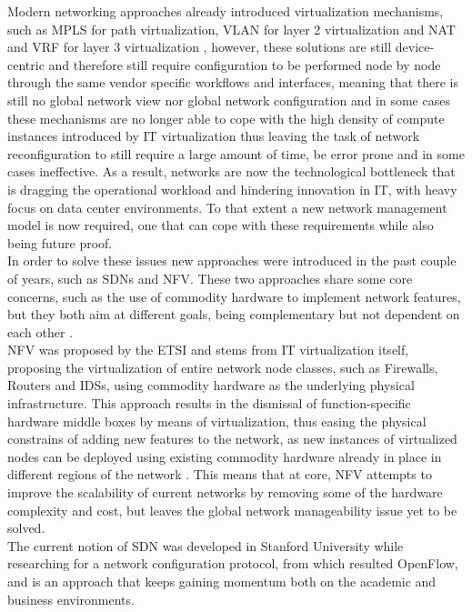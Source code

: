 %
Modern networking approaches already introduced virtualization mechanisms, such as \gls{MPLS} for path virtualization, \gls{VLAN} for layer 2 virtualization and \gls{NAT} and \gls{VRF} for layer 3 virtualization \cite{Kreutz2014}, however, these solutions are still device-centric and therefore still require configuration to be performed node by node through the same vendor specific workflows and interfaces, meaning that there is still no global network view nor global network configuration \cite{Kreutz2014} and in some cases these mechanisms are no longer able to cope with the high density of compute instances introduced by \gls{IT} virtualization \cite{Duffy2012} thus leaving the task of network reconfiguration to still require a large amount of time, be error prone and in some cases ineffective.
As a result, networks are now the technological bottleneck that is dragging the operational workload and hindering innovation in \gls{IT}, with heavy focus on data center environments.
To that extent a new network management model is now required, one that can cope with these requirements while also being future proof.\\
%
In order to solve these issues new approaches were introduced in the past couple of years, such as \glspl{SDN} and \gls{NFV}.
These two approaches share some core concerns, such as the use of commodity hardware to implement network features, but they both aim at different goals, being complementary but not dependent on each other \cite{ETSI2014}\cite{Pate2013}.\\
%
\gls{NFV} was proposed by the \gls{ETSI} and stems from \gls{IT} virtualization itself, proposing the virtualization of entire network node classes, such as Firewalls, Routers and \glspl{IDS}, using commodity hardware as the underlying physical infrastructure.
This approach results in the dismissal of function-specific hardware middle boxes by means of virtualization, thus easing the physical constrains of adding new features to the network, as new instances of virtualized nodes can be deployed using existing commodity hardware already in place in different regions of the network \cite{ETSI2014}.
This means that at core, \gls{NFV} attempts to improve the scalability of current networks by removing some of the hardware complexity and cost, but leaves the global network manageability issue yet to be solved.\\
%
The current notion of \gls{SDN} was developed in Stanford University while researching for a network configuration protocol, from which resulted OpenFlow, and is an approach that keeps gaining momentum both on the academic and business environments.
